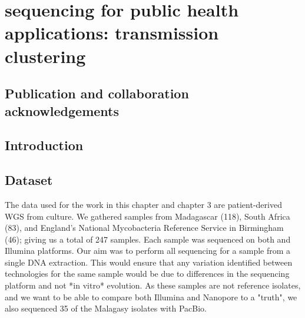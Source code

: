 
\chapter{\ont{} sequencing for \mtb{} public health applications: transmission clustering}

\ifpdf
    \graphicspath{{Chapter2/Figs/Raster/}{Chapter2/Figs/PDF/}{Chapter2/Figs/}}
\else
    \graphicspath{{Chapter2/Figs/Vector/}{Chapter2/Figs/}}
\fi



\section*{Publication and collaboration acknowledgements}


\section{Introduction}


\section{Dataset}


The data used for the work in this chapter and chapter 3 are patient-derived \mtb{} WGS from culture. We gathered samples from Madagascar (118), South Africa (83), and England's National Mycobacteria Reference Service in Birmingham (46); giving us a total of 247 samples.  
Each sample was sequenced on both \ont{} and Illumina platforms. Our aim was to perform all sequencing for a sample from a single DNA extraction. This would ensure that any variation identified between technologies for the same sample would be due to differences in the sequencing platform and not *in vitro* evolution.  
As these samples are not reference isolates, and we want to be able to compare both Illumina and Nanopore to a "truth", we also sequenced 35 of the Malagasy isolates with PacBio.

